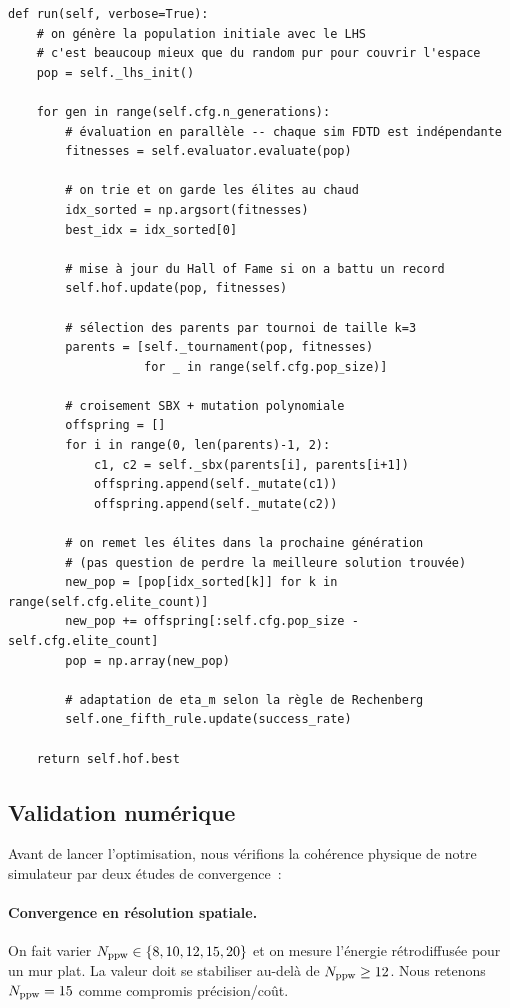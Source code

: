 \documentclass[12pt,a4paper]{article}
\begin{document}
\begin{lstlisting}[caption={Boucle principale de l'algorithme génétique (src/optim/genetic.py -- extraits simplifiés)}]
def run(self, verbose=True):
    # on génère la population initiale avec le LHS
    # c'est beaucoup mieux que du random pur pour couvrir l'espace
    pop = self._lhs_init()

    for gen in range(self.cfg.n_generations):
        # évaluation en parallèle -- chaque sim FDTD est indépendante
        fitnesses = self.evaluator.evaluate(pop)

        # on trie et on garde les élites au chaud
        idx_sorted = np.argsort(fitnesses)
        best_idx = idx_sorted[0]

        # mise à jour du Hall of Fame si on a battu un record
        self.hof.update(pop, fitnesses)

        # sélection des parents par tournoi de taille k=3
        parents = [self._tournament(pop, fitnesses)
                   for _ in range(self.cfg.pop_size)]

        # croisement SBX + mutation polynomiale
        offspring = []
        for i in range(0, len(parents)-1, 2):
            c1, c2 = self._sbx(parents[i], parents[i+1])
            offspring.append(self._mutate(c1))
            offspring.append(self._mutate(c2))

        # on remet les élites dans la prochaine génération
        # (pas question de perdre la meilleure solution trouvée)
        new_pop = [pop[idx_sorted[k]] for k in range(self.cfg.elite_count)]
        new_pop += offspring[:self.cfg.pop_size - self.cfg.elite_count]
        pop = np.array(new_pop)

        # adaptation de eta_m selon la règle de Rechenberg
        self.one_fifth_rule.update(success_rate)

    return self.hof.best
\end{lstlisting}

\subsection{Validation numérique}
\label{ssec:validation}

Avant de lancer l'optimisation, nous vérifions la cohérence physique de notre
simulateur par deux études de convergence~:

\paragraph{Convergence en résolution spatiale.}
On fait varier $N_{\rm ppw} \in \{8, 10, 12, 15, 20\}$ et on mesure l'énergie
rétrodiffusée pour un mur plat. La valeur doit se stabiliser au-delà de
$N_{\rm ppw} \geq 12$. Nous retenons $N_{\rm ppw} = 15$ comme compromis
précision/coût.
\end{document}
